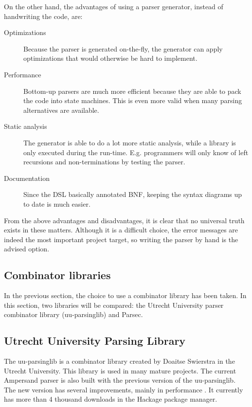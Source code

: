 \noindent
On the other hand, the advantages of using a parser generator, instead of handwriting the code, are:
\begin{description}
	\item[Optimizations] Because the parser is generated on-the-fly, the generator can apply optimizations that would otherwise be hard to implement.
	\item[Performance] Bottom-up parsers are much more efficient because they are able to pack the code into state machines.
		This is even more valid when many parsing alternatives are available.
	\item[Static analysis] The generator is able to do a lot more static analysis, while a library is only executed during the run-time.
    E.g. programmers will only know of left recursions and non-terminations by testing the parser.
	\item[Documentation] Since the DSL basically annotated BNF, keeping the syntax diagrams up to date is much easier.
\end{description}

\noindent
From the above advantages and disadvantages, it is clear that no universal truth exists in these matters.
Although it is a difficult choice, the error messages are indeed the most important project target, so writing the parser by hand is the advised option.

\subsection{Combinator libraries}
In the previous section, the choice to use a combinator library has been taken.
In this section, two libraries will be compared: the Utrecht University parser combinator library (uu-parsinglib) and Parsec.

\subsection{Utrecht University Parsing Library}
%
The uu-parsinglib is a combinator library created by Doaitse Swierstra in the Utrecht University.
This library is used in many mature projects.
The current Ampersand parser is also built with the previous version of the uu-parsinglib.
The new version has several improvements, mainly in performance \cite{benchmark}.
It currently has more than 4 thousand downloads in the Hackage package manager.

